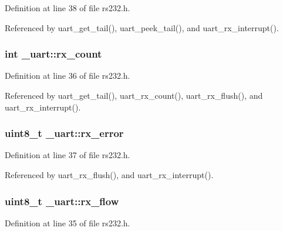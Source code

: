 Definition at line 38 of file rs232.\+h.



Referenced by uart\+\_\+get\+\_\+tail(), uart\+\_\+peek\+\_\+tail(), and uart\+\_\+rx\+\_\+interrupt().

\subsubsection[{\texorpdfstring{rx\+\_\+count}{rx_count}}]{\setlength{\rightskip}{0pt plus 5cm}int \+\_\+uart\+::rx\+\_\+count}\hypertarget{struct__uart_a50b344402c339343e3f32c82358e190c}{}\label{struct__uart_a50b344402c339343e3f32c82358e190c}


Definition at line 36 of file rs232.\+h.



Referenced by uart\+\_\+get\+\_\+tail(), uart\+\_\+rx\+\_\+count(), uart\+\_\+rx\+\_\+flush(), and uart\+\_\+rx\+\_\+interrupt().

\subsubsection[{\texorpdfstring{rx\+\_\+error}{rx_error}}]{\setlength{\rightskip}{0pt plus 5cm}uint8\+\_\+t \+\_\+uart\+::rx\+\_\+error}\hypertarget{struct__uart_a6c0b44754c36dd831e1da4f02b124167}{}\label{struct__uart_a6c0b44754c36dd831e1da4f02b124167}


Definition at line 37 of file rs232.\+h.



Referenced by uart\+\_\+rx\+\_\+flush(), and uart\+\_\+rx\+\_\+interrupt().

\subsubsection[{\texorpdfstring{rx\+\_\+flow}{rx_flow}}]{\setlength{\rightskip}{0pt plus 5cm}uint8\+\_\+t \+\_\+uart\+::rx\+\_\+flow}\hypertarget{struct__uart_a193691b69079880daf5b5b9894fb6aa5}{}\label{struct__uart_a193691b69079880daf5b5b9894fb6aa5}


Definition at line 35 of file rs232.\+h.



